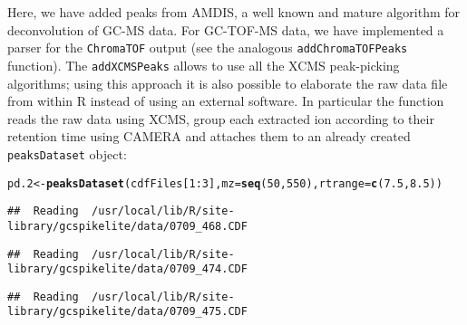 \documentclass{article}\usepackage[]{graphicx}\usepackage[]{color}
\makeatletter
\newcommand{\hlnum}[1]{\textcolor[rgb]{0.686,0.059,0.569}{#1}}%
\newcommand{\hlopt}[1]{\textcolor[rgb]{0,0,0}{#1}}%
\newcommand{\hlstd}[1]{\textcolor[rgb]{0.345,0.345,0.345}{#1}}%
\newcommand{\hlkwb}[1]{\textcolor[rgb]{0.69,0.353,0.396}{#1}}%
\newcommand{\hlkwc}[1]{\textcolor[rgb]{0.333,0.667,0.333}{#1}}%
\newcommand{\hlkwd}[1]{\textcolor[rgb]{0.737,0.353,0.396}{\textbf{#1}}}%
\newenvironment{kframe}{%
 \def\at@end@of@kframe{}%
 \ifinner\ifhmode%
  \def\at@end@of@kframe{\end{minipage}}%
  \begin{minipage}{\columnwidth}%
 \fi\fi%
 \def\FrameCommand##1{\hskip\@totalleftmargin \hskip-\fboxsep
 \colorbox{shadecolor}{##1}\hskip-\fboxsep
     \hskip-\linewidth \hskip-\@totalleftmargin \hskip\columnwidth}%
 \MakeFramed {\advance\hsize-\width
   \@totalleftmargin\z@ \linewidth\hsize
   \@setminipage}}%
 {\par\unskip\endMakeFramed%
 \at@end@of@kframe}
\newenvironment{knitrout}{}{} %
\makeatother
\begin{document}
Here, we have added peaks from AMDIS, a well known and mature
algorithm for deconvolution of GC-MS data. For GC-TOF-MS data, we have
implemented a parser for the \texttt{ChromaTOF} output (see the
analogous \texttt{addChromaTOFPeaks} function). The
\texttt{addXCMSPeaks} allows to use all the XCMS peak-picking
algorithms; using this approach it is also possible to elaborate the
raw data file from within R instead of using an external software.
In particular the function reads the raw data using XCMS, group each extracted ion
according to their retention time using CAMERA and attaches them to an
already created \texttt{peaksDataset} object:

\begin{knitrout}
\color{fgcolor}\begin{kframe}
\begin{alltt}
\hlstd{pd.2} \hlkwb{<-} \hlkwd{peaksDataset}\hlstd{(cdfFiles[}\hlnum{1}\hlopt{:}\hlnum{3}\hlstd{],} \hlkwc{mz} \hlstd{=} \hlkwd{seq}\hlstd{(}\hlnum{50}\hlstd{,} \hlnum{550}\hlstd{),} \hlkwc{rtrange} \hlstd{=} \hlkwd{c}\hlstd{(}\hlnum{7.5}\hlstd{,} \hlnum{8.5}\hlstd{))}
\end{alltt}
\begin{verbatim}
##  Reading  /usr/local/lib/R/site-library/gcspikelite/data/0709_468.CDF
\end{verbatim}


{\ttfamily\noindent\itshape\color{messagecolor}{\#\# Create profile matrix with method 'bin' and step 1 ... OK}}\begin{verbatim}
##  Reading  /usr/local/lib/R/site-library/gcspikelite/data/0709_474.CDF
\end{verbatim}


{\ttfamily\noindent\itshape\color{messagecolor}{\#\# Create profile matrix with method 'bin' and step 1 ... OK}}\begin{verbatim}
##  Reading  /usr/local/lib/R/site-library/gcspikelite/data/0709_475.CDF
\end{verbatim}



\end{kframe}
\end{knitrout}
\end{document}
